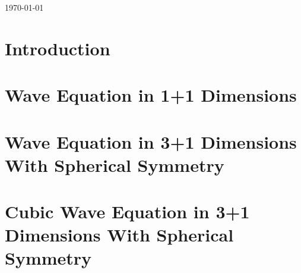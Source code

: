 \documentclass[
11pt, %
english, %
singlespacing, %
headsepline, %
]{MastersDoctoralThesis} %
\begin{document}
\begin{titlepage}
\begin{center}
\vfill
{\small \today}\\[4cm] %
 
\vfill
\end{center}
\end{titlepage}



\pagestyle{review} 



\section{Introduction}



\section{Wave Equation in 1+1 Dimensions}



\section{Wave Equation in 3+1 Dimensions With Spherical Symmetry}



\section{Cubic Wave Equation in 3+1 Dimensions With Spherical Symmetry}

\end{document}
